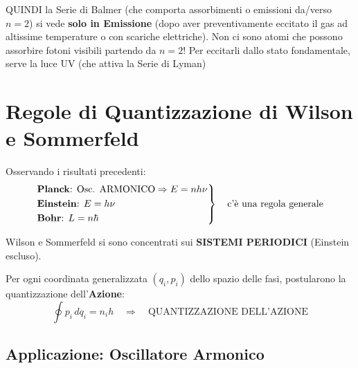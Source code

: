 \documentclass[11pt, a4paper]{article}
\begin{document}
\noindent
QUINDI la Serie di Balmer (che comporta assorbimenti o emissioni da/verso $n=2$) si vede \textbf{solo in Emissione} (dopo aver preventivamente eccitato il gas ad altissime temperature o con scariche elettriche). Non ci sono atomi che possono assorbire fotoni visibili partendo da $n=2$! %
Per eccitarli dallo stato fondamentale, serve la luce UV (che attiva la Serie di Lyman) %

\section{Regole di Quantizzazione di Wilson e Sommerfeld} %

Osservando i risultati precedenti: %
\begin{equation*}
    \left.
    \begin{aligned}
        &\text{\textbf{Planck}: Osc. ARMONICO} \Rightarrow E = n h \nu \\ %
        &\text{\textbf{Einstein}: } E = h \nu \\ %
        &\text{\textbf{Bohr}: } L = n \hbar %
    \end{aligned}
    \right\} \quad \text{c'è una regola generale} %
\end{equation*}

\noindent
Wilson e Sommerfeld si sono concentrati sui \textbf{SISTEMI PERIODICI} (Einstein escluso). %

\noindent
Per ogni coordinata generalizzata $(q_i, p_i)$ dello spazio delle fasi, postularono la quantizzazione dell'\textbf{Azione}: %
\begin{equation}
    \boxed{ \oint p_i \, dq_i = n_i h } \quad \Rightarrow \quad \text{QUANTIZZAZIONE DELL'AZIONE} %
\end{equation}

\subsection{Applicazione: Oscillatore Armonico} %
\end{document}
